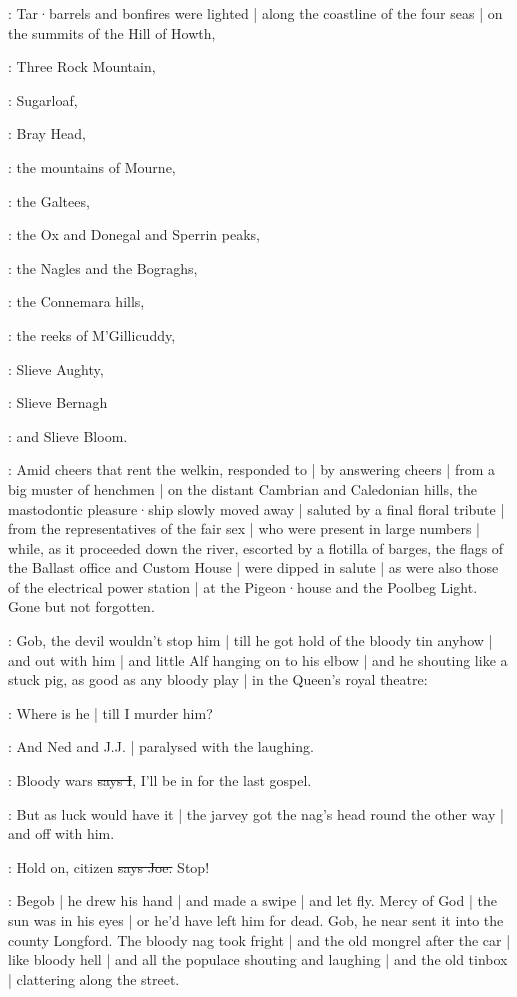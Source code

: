 :
Tar·barrels and bonfires were lighted |
along the coastline of the four seas |
on the summits of the Hill of Howth,

:
Three Rock Mountain,

:
Sugarloaf,

:
Bray Head,

:
the mountains of Mourne,

:
the Galtees,

:
the Ox and Donegal and Sperrin peaks,

:
the Nagles and the Bograghs,

:
the Connemara hills,

:
the reeks of M'Gillicuddy,

:
Slieve Aughty,

:
Slieve Bernagh

:
and Slieve Bloom.

:
Amid cheers that rent the welkin,
responded to |
by answering cheers |
from a big muster of henchmen |
on the distant Cambrian and Caledonian hills,
the mastodontic pleasure·ship slowly moved away |
saluted by a final floral tribute |
from the representatives of the fair sex |
who were present in large numbers |
while,
as it proceeded down the river,
escorted by a flotilla of barges,
the flags of the Ballast office and Custom House |
were dipped in salute |
as were also those of the electrical power station |
at the Pigeon·house and the Poolbeg Light.
Gone but not forgotten.

\Nq:
Gob,
the devil wouldn't stop him |
till he got hold of the bloody tin anyhow |
and out with him |
and little Alf hanging on to his elbow |
and he shouting like a stuck pig,
as good as any bloody play |
in the Queen's royal theatre:

\citizen:
Where is he |
till I murder him?

\Nq:
And Ned and J.J. |
paralysed with the laughing.

:
Bloody wars
\sout{says I},
I'll be in for the last gospel.

\Nq:
But as luck would have it
 |
the jarvey got the nag's head round the other way |
and off with him.

\joe:
Hold on,
citizen
\sout{says Joe.}
Stop!

\Nq:
Begob |
he drew his hand |
and made a swipe |
and let fly.
Mercy of God |
the sun was in his eyes |
or he'd have left him for dead.
Gob,
he near sent it into the county Longford.
The bloody nag took fright |
and the old mongrel after the car |
like bloody hell |
and all the populace shouting and laughing |
and the old tinbox |
clattering along the street.

